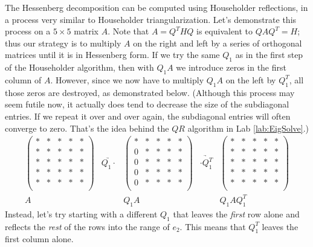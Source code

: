 The Hessenberg decomposition can be computed using Householder reflections, in a process very similar to Householder triangularization.
Let's demonstrate this process on a $5 \times 5$ matrix $A$.
Note that $A=Q^THQ$ is equivalent to $QAQ^T = H$; thus our strategy is to multiply $A$ on the right and left by a series of orthogonal matrices until it is in Hessenberg form.
If we try the same $Q_1$ as in the first step of the Householder algorithm, then with $Q_1 A$ we introduce zeros in the first column of $A$.
However, since we now have to multiply $Q_1 A$ on the left by $Q_1^T$, all those zeros are destroyed, as demonstrated below.
(Although this process may seem futile now, it actually does tend to decrease the size of the subdiagonal entries.
If we repeat it over and over again, the subdiagonal entries will often converge to zero.
That's the idea behind the $QR$ algorithm in Lab \ref{lab:EigSolve}.)
\[
\begin{array}{ccccc} 
\begin{pmatrix}
* & * & * & * & *\\
* & * & * & * & *\\
* & * & * & * & *\\
* & * & * & * & *\\
* & * & * & * & *\\
\end{pmatrix} 
&\underrightarrow{Q_1 \cdot }&
\begin{pmatrix}
* & * & * & * & *\\
0 & * & * & * & *\\
0 & * & * & * & *\\
0 & * & * & * & *\\
0 & * & * & * & *\\
\end{pmatrix} 
&\underrightarrow{\cdot Q_1^T }&
\begin{pmatrix}
* & * & * & * & *\\
* & * & * & * & *\\
* & * & * & * & *\\
* & * & * & * & *\\
* & * & * & * & *\\
\end{pmatrix} 
\\ 
A & & Q_1A & & Q_1 A Q_1^T
  \end{array}
\]
Instead, let's try starting with a different $Q_1$ that leaves the \emph{first} row alone and reflects the \emph{rest} of the rows into the range of $e_2$. This means that $Q_1^T$ leaves the first column alone.
